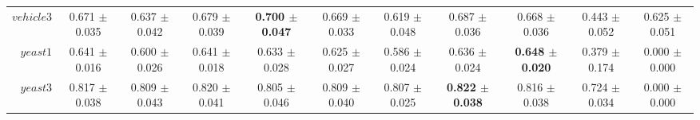 \begin{table}[!ht]
{\begin{tabular}{r c c c c c c c c c c}
$vehicle3$ & 0.671 $\pm$ 0.035 & 0.637 $\pm$ 0.042 & 0.679 $\pm$ 0.039 & \textbf{0.700 $\pm$ 0.047} & 0.669 $\pm$ 0.033 & 0.619 $\pm$ 0.048 & 0.687 $\pm$ 0.036 & 0.668 $\pm$ 0.036 & 0.443 $\pm$ 0.052 & 0.625 $\pm$ 0.051 \\
$yeast1$ & 0.641 $\pm$ 0.016 & 0.600 $\pm$ 0.026 & 0.641 $\pm$ 0.018 & 0.633 $\pm$ 0.028 & 0.625 $\pm$ 0.027 & 0.586 $\pm$ 0.024 & 0.636 $\pm$ 0.024 & \textbf{0.648 $\pm$ 0.020} & 0.379 $\pm$ 0.174 & 0.000 $\pm$ 0.000 \\
$yeast3$ & 0.817 $\pm$ 0.038 & 0.809 $\pm$ 0.043 & 0.820 $\pm$ 0.041 & 0.805 $\pm$ 0.046 & 0.809 $\pm$ 0.040 & 0.807 $\pm$ 0.025 & \textbf{0.822 $\pm$ 0.038} & 0.816 $\pm$ 0.038 & 0.724 $\pm$ 0.034 & 0.000 $\pm$ 0.000 \\
\end{tabular}}
\end{table}
